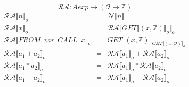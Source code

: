 \documentclass[12pt]{article}
\newcommand{\RA}{\mathcal{RA}}
\begin{document}
\[ \RA : Aexp \rightarrow (\mathcal{O} \rightarrow \mathds{Z} ) \]
\[
\begin{matrix}
\RA\llbracket n \rrbracket_o & = & \mathcal{N}\llbracket n \rrbracket\\
\RA\llbracket x \rrbracket_o & = & \RA\llbracket GET\llbracket (x,\mathds{Z}) \rrbracket_o \rrbracket_o\\
\RA\llbracket FROM \enspace var \enspace CALL \enspace x \rrbracket_o & = & GET\llbracket (x,\mathds{Z}) \rrbracket_{GET\llbracket (x,\mathcal{O}) \rrbracket_o}\\
\RA\llbracket a_1 + a_2 \rrbracket_o & = & \RA\llbracket a_1 \rrbracket_o + \RA\llbracket a_2 \rrbracket_o\\
\RA\llbracket a_1 * a_2 \rrbracket_o & = & \RA\llbracket a_1 \rrbracket_o * \RA\llbracket a_2 \rrbracket_o\\
\RA\llbracket a_1 - a_2 \rrbracket_o & = & \RA\llbracket a_1 \rrbracket_o - \RA\llbracket a_2 \rrbracket_o\\
\end{matrix}
\]
\end{document}

